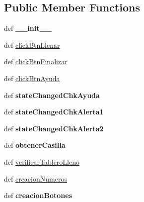 \subsection*{Public Member Functions}
\begin{DoxyCompactItemize}
\item 
\hypertarget{class_sudoku_main_window_1_1_sudoku_main_window_a928fafad3bb263c11f16d84935cff2d2}{def {\bfseries \-\_\-\-\_\-init\-\_\-\-\_\-}}\label{class_sudoku_main_window_1_1_sudoku_main_window_a928fafad3bb263c11f16d84935cff2d2}

\item 
def \hyperlink{class_sudoku_main_window_1_1_sudoku_main_window_adea80094a0be9e4f5cbde0c56713d64a}{click\-Btn\-Llenar}
\item 
def \hyperlink{class_sudoku_main_window_1_1_sudoku_main_window_a3d717334d4dfec7d470cca6aca93055a}{click\-Btn\-Finalizar}
\item 
def \hyperlink{class_sudoku_main_window_1_1_sudoku_main_window_a52670b6c332989395bc5ea2e22b934a4}{click\-Btn\-Ayuda}
\item 
\hypertarget{class_sudoku_main_window_1_1_sudoku_main_window_a998eec966a54bc105599f0b0da7c1c85}{def {\bfseries state\-Changed\-Chk\-Ayuda}}\label{class_sudoku_main_window_1_1_sudoku_main_window_a998eec966a54bc105599f0b0da7c1c85}

\item 
\hypertarget{class_sudoku_main_window_1_1_sudoku_main_window_ac8a0a4d664745d1e1d364051477cceab}{def {\bfseries state\-Changed\-Chk\-Alerta1}}\label{class_sudoku_main_window_1_1_sudoku_main_window_ac8a0a4d664745d1e1d364051477cceab}

\item 
\hypertarget{class_sudoku_main_window_1_1_sudoku_main_window_ac9eb37125e59154ae4a52d86dd4f950b}{def {\bfseries state\-Changed\-Chk\-Alerta2}}\label{class_sudoku_main_window_1_1_sudoku_main_window_ac9eb37125e59154ae4a52d86dd4f950b}

\item 
\hypertarget{class_sudoku_main_window_1_1_sudoku_main_window_a824e2abb8fae56fb9e1e717be893afb6}{def {\bfseries obtener\-Casilla}}\label{class_sudoku_main_window_1_1_sudoku_main_window_a824e2abb8fae56fb9e1e717be893afb6}

\item 
def \hyperlink{class_sudoku_main_window_1_1_sudoku_main_window_ad2b406eb64afec77691ea9cb948e39fe}{verificar\-Tablero\-Lleno}
\item 
def \hyperlink{class_sudoku_main_window_1_1_sudoku_main_window_a03974f85f3e539e3b25b4c6d1c153014}{creacion\-Numeros}
\item 
\hypertarget{class_sudoku_main_window_1_1_sudoku_main_window_a2f0494b5316de0f36057c788ee94bedf}{def {\bfseries creacion\-Botones}}\label{class_sudoku_main_window_1_1_sudoku_main_window_a2f0494b5316de0f36057c788ee94bedf}


\end{DoxyCompactItemize}
